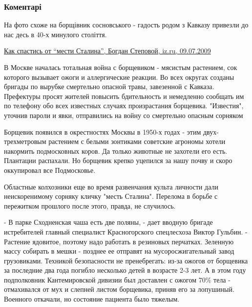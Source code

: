  
 
 
 
 
\subsubsection{Коментарі}
\label{sec:03_12_2021.fb.zaborin_dmitrij.1.den_ukr_borscha.cmt}

\begin{itemize} %


На фото схоже на борщівник сосновського - гадость родом з Кавказу привезли до
нас десь в 40-х минулого століття.

\href{https://iz.ru/news/350529}{%
Как спастись от \enquote{мести Сталина}, Богдан Степовой, iz.ru, 09.07.2009%
}

\begin{multicols}{2}
В Москве началась тотальная война с борщевиком - мясистым растением, сок
которого вызывает ожоги и аллергические реакции. Во всех округах созданы
бригады по вырубке смертельно опасной травы, завезенной с Кавказа. Префектуры
просят жителей повысить бдительность и немедленно сообщать им по телефону обо
всех известных случаях произрастания борщевика. "Известия", уточнив пароли и
явки, отправились на войну со смертельно опасным сорняком

Борщевик появился в окрестностях Москвы в 1950-х годах - этим двух-трехметровым
растением с белыми зонтиками советские агрономы хотели накормить подмосковных
коров. Да только животные не захотели его есть. Плантации распахали. Но
борщевик крепко уцепился за нашу почву и скоро оккупировал все Подмосковье.

Областные колхозники еще во время развенчания культа личности дали
неискоренимому сорняку кличку "месть Сталина". Перелома в борьбе с пережитком
прошлого после этого, правда, не случилось.

- В парке Сходненская чаша есть две поляны, - дает вводную бригаде истребителей
главный специалист Красногорского спецлесхоза Виктор Гульбин. - Растение
ядовитое, поэтому надо работать в резиновых перчатках. Зеленную массу собирать
в мешки - позднее ее отправят на мусоросжигательный завод грузовиками. Техникой
безопасности не пренебрегать: из-за ожогов от борщевика за последние два года
погибло несколько детей в возрасте 2-3 лет. А в этом году подполковник
Кантемировской дивизии был доставлен с ожогом 70\% тела - отмахивался от мух и
слепней листом борщевика, приняв его за лопушиный. Военного откачали, но
состояние пациента было тяжелым.


\end{multicols}
\end{itemize}
